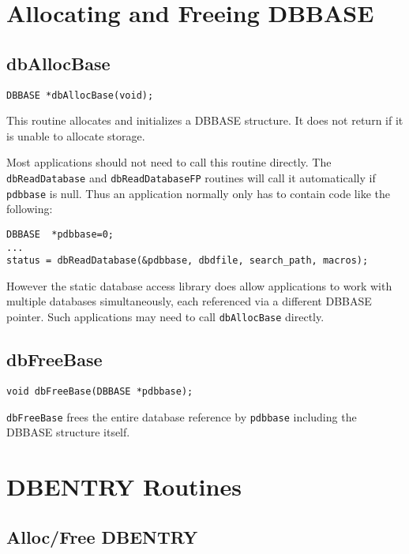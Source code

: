 \section{Allocating and Freeing DBBASE}

\subsection{dbAllocBase}

\begin{verbatim}
DBBASE *dbAllocBase(void);
\end{verbatim}

This routine allocates and initializes a DBBASE structure.
It does not return if it is unable to allocate storage.

Most applications should not need to call this routine directly.
The \verb|dbReadDatabase| and \verb|dbReadDatabaseFP| routines will call it automatically if \verb|pdbbase| is null.
Thus an application normally only has to contain code like the following:

\begin{verbatim}
DBBASE  *pdbbase=0;
...
status = dbReadDatabase(&pdbbase, dbdfile, search_path, macros);
\end{verbatim}

However the static database access library does allow applications to work with multiple databases simultaneously, each referenced via a different DBBASE pointer.
Such applications may need to call \verb|dbAllocBase| directly.

\subsection{dbFreeBase}

\begin{verbatim}
void dbFreeBase(DBBASE *pdbbase);
\end{verbatim}

\verb|dbFreeBase| frees the entire database reference by \verb|pdbbase| including the DBBASE structure itself.

\section{DBENTRY Routines}

\subsection{Alloc/Free DBENTRY}

